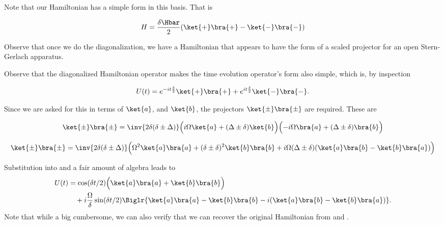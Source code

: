 {Note that our Hamiltonian has a simple form in this basis.  That is

\begin{equation}\label{eqn:qmIexamPractice2008Dec:2:70}
H = \frac{\delta \Hbar}{2} (\ket{+}\bra{+} - \ket{-}\bra{-} )
\end{equation}

Observe that once we do the diagonalization, we have a Hamiltonian that appears to have the form of a scaled projector for an open Stern-Gerlach apparatus.

Observe that the diagonalized Hamiltonian operator makes the time evolution operator's form also simple, which is, by inspection

\begin{equation}\label{eqn:qmIexamPractice2008Dec:2:80}
U(t) =
e^{-i t \frac{\delta}{2}} \ket{+}\bra{+}
+ e^{i t \frac{\delta}{2}} \ket{-}\bra{-}.
\end{equation}

Since we are asked for this in terms of \(\ket{a}\), and \(\ket{b}\), the projectors \(\ket{\pm}\bra{\pm}\) are required.  These are

\begin{equation}\label{eqn:qmIexamPractice2008Dec:690}
\begin{aligned}
\ket{\pm}\bra{\pm}
&= \inv{2 \delta (\delta \pm \Delta)}
\Bigl( i \Omega \ket{a} + (\Delta \pm \delta) \ket{b} \Bigr)
\Bigl( -i \Omega \bra{a} + (\Delta \pm \delta) \bra{b} \Bigr) \\
\end{aligned}
\end{equation}

\begin{equation}\label{eqn:qmIexamPractice2008Dec:2:90}
\ket{\pm}\bra{\pm}
= \inv{2 \delta (\delta \pm \Delta)}
\Bigl(
\Omega^2 \ket{a}\bra{a}
+(\delta \pm \delta)^2 \ket{b}\bra{b}
+i \Omega (\Delta \pm \delta) (
\ket{a}\bra{b}
-\ket{b}\bra{a}
)
\Bigr)
\end{equation}

Substitution into  and a fair amount of algebra leads to
\begin{equation}\label{eqn:qmIexamPractice2008Dec:2:100}
\begin{aligned}
U(t) &= \cos(\delta t/2) \Bigl( \ket{a}\bra{a} + \ket{b}\bra{b} \Bigr) \\
&\quad
+ i \frac{\Omega}{\delta} \sin(\delta t/2) \Biglr{
\ket{a}\bra{a} - \ket{b}\bra{b}
-i (\ket{a}\bra{b} - \ket{b}\bra{a} )
}.
\end{aligned}
\end{equation}
Note that while a big cumbersome, we can also verify that we can recover the original Hamiltonian from  and .

}
